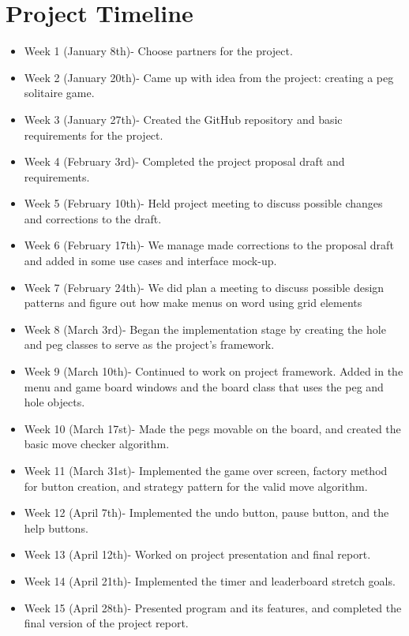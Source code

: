 \documentclass[10pt,conference,onecolumn,compsoc]{IEEEtran}
\begin{document}
\section{Project Timeline}
\begin{itemize}
    \item Week 1 (January 8th)- Choose partners for the project.
    \item Week 2 (January 20th)- Came up with idea from the project: creating a peg solitaire game.
    \item Week 3 (January 27th)- Created the GitHub repository and basic requirements for the project.
    \item Week 4 (February 3rd)- Completed the project proposal draft and requirements.
    \item Week 5 (February 10th)- Held project meeting to discuss possible changes and corrections to the draft.
    \item Week 6 (February 17th)- We manage made corrections to the proposal draft and added in some use cases and interface mock-up.
    \item Week 7 (February 24th)- We did plan a meeting to discuss possible design patterns and figure out how make menus on word using grid elements
    \item Week 8 (March 3rd)- Began the implementation stage by creating the hole and peg classes to serve as the project's framework.
    \item Week 9 (March 10th)- Continued to work on project framework. Added in the menu and game board windows and the board class that uses the peg and hole objects.
    \item Week 10 (March 17st)- Made the pegs movable on the board, and created the basic move checker algorithm.
    \item Week 11 (March 31st)- Implemented the game over screen, factory method for button creation, and strategy pattern for the valid move algorithm.
    \item Week 12 (April 7th)- Implemented the undo button, pause button, and the help buttons.
    \item Week 13 (April 12th)- Worked on project presentation and final report.
    \item Week 14 (April 21th)- Implemented the timer and leaderboard stretch goals.
    \item Week 15 (April 28th)- Presented program and its features, and completed the final version of the project report.
\end{itemize}
\end{document}
